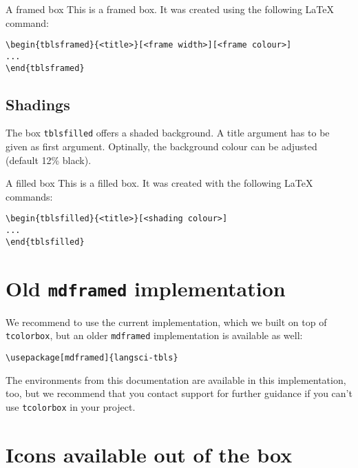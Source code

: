 \documentclass[output=paper]{langscibook}
\begin{document}
\begin{tblsframed}{A framed box}
This is a framed box. It was created using the following \LaTeX{} command:
	
\begin{lstlisting}
\begin{tblsframed}{<title>}[<frame width>][<frame colour>]
...
\end{tblsframed}
\end{lstlisting}
\end{tblsframed}

\subsection{Shadings}

The box \texttt{tblsfilled} offers a shaded background. A title argument has to be given as first argument. Optinally, the background colour can be adjusted (default 12\% black). 

\begin{tblsfilled}{A filled box}
	This is a filled box. It was created with the following \LaTeX{} commands:
\begin{lstlisting}
\begin{tblsfilled}{<title>}[<shading colour>]
...
\end{tblsfilled}
\end{lstlisting}
	
\end{tblsfilled}

\section{Old \texttt{mdframed} implementation}
We recommend to use the current implementation, which we built on top of \texttt{tcolorbox}, but an older \texttt{mdframed} implementation is available as well:
\begin{lstlisting}
\usepackage[mdframed]{langsci-tbls}
\end{lstlisting}

The environments from this documentation are available in this implementation, too, but we recommend that you contact \lsp{} support for further guidance if you can't use \texttt{tcolorbox} in your project.

\section{Icons available out of the box}\label{sec:iconlist}
\end{document}
